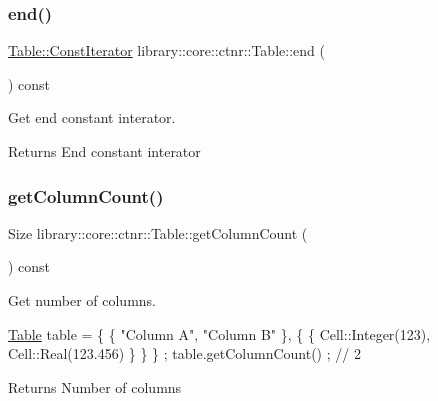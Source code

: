 \subsubsection{\texorpdfstring{end()}{end()}}
{\footnotesize\ttfamily \hyperlink{classlibrary_1_1core_1_1ctnr_1_1_table_a7fa78ad4e7e8d27ceab0bff51ab84fc3}{Table\+::\+Const\+Iterator} library\+::core\+::ctnr\+::\+Table\+::end (\begin{DoxyParamCaption}{ }\end{DoxyParamCaption}) const}



Get end constant interator. 

\begin{DoxyReturn}{Returns}
End constant interator 
\end{DoxyReturn}
\mbox{\label{classlibrary_1_1core_1_1ctnr_1_1_table_af725ea46d4737e1c3d0d8ad5a4dda733}} 
\subsubsection{\texorpdfstring{get\+Column\+Count()}{getColumnCount()}}
{\footnotesize\ttfamily Size library\+::core\+::ctnr\+::\+Table\+::get\+Column\+Count (\begin{DoxyParamCaption}{ }\end{DoxyParamCaption}) const}



Get number of columns. 


\begin{DoxyCode}
\hyperlink{classlibrary_1_1core_1_1ctnr_1_1_table_a5b11121caa4288c3da642af7c6a5a632}{Table} table = \{ \{ \textcolor{stringliteral}{"Column A"}, \textcolor{stringliteral}{"Column B"} \}, \{ \{ Cell::Integer(123), Cell::Real(123.456) \} \} \} ;
table.getColumnCount() ; \textcolor{comment}{// 2}
\end{DoxyCode}


\begin{DoxyReturn}{Returns}
Number of columns 
\end{DoxyReturn}
\mbox{\label{classlibrary_1_1core_1_1ctnr_1_1_table_a18036491993fea84dd2a595e7703258f}} 
